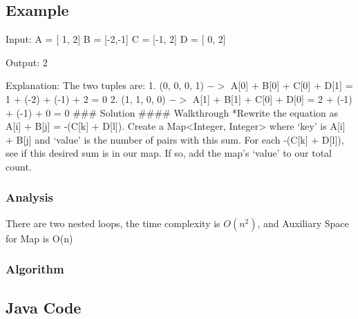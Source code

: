 \documentclass[]{book}
\begin{document}
\hypertarget{example-6}{%
\subsection{Example}\label{example-6}}

Input:
A = {[} 1, 2{]}
B = {[}-2,-1{]}
C = {[}-1, 2{]}
D = {[} 0, 2{]}

Output:
2

Explanation:
The two tuples are:
1. (0, 0, 0, 1) \(->\) A{[}0{]} + B{[}0{]} + C{[}0{]} + D{[}1{]} = 1 + (-2) + (-1) + 2 = 0
2. (1, 1, 0, 0) \(->\) A{[}1{]} + B{[}1{]} + C{[}0{]} + D{[}0{]} = 2 + (-1) + (-1) + 0 = 0
\#\#\# Solution
\#\#\#\# Walkthrough
*Rewrite the equation as A{[}i{]} + B{[}j{]} = -(C{[}k{]} + D{[}l{]}).
Create a Map\textless{}Integer, Integer\textgreater{} where `key' is A{[}i{]} + B{[}j{]} and `value' is the number of pairs with this sum.
For each -(C{[}k{]} + D{[}l{]}), see if this desired sum is in our map. If so, add the map's `value' to our total count.

\hypertarget{analysis-8}{%
\subsubsection{Analysis}\label{analysis-8}}

There are two nested loops, the time complexity is \(O(n^2)\), and Auxiliary Space for Map is O(n)

\hypertarget{algorithm-8}{%
\subsubsection{Algorithm}\label{algorithm-8}}

\hypertarget{java-code-6}{%
\subsection{Java Code}\label{java-code-6}}
\end{document}

